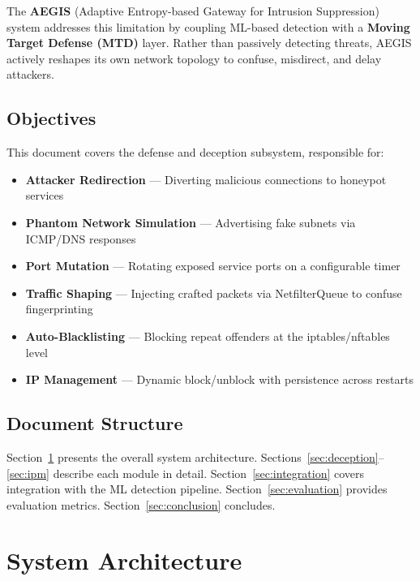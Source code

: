 \documentclass[12pt,a4paper]{article}
\begin{document}
The \textbf{AEGIS} (Adaptive Entropy-based Gateway for Intrusion Suppression) system addresses this limitation by coupling ML-based detection with a \textbf{Moving Target Defense (MTD)} layer. Rather than passively detecting threats, AEGIS actively reshapes its own network topology to confuse, misdirect, and delay attackers.

\subsection{Objectives}

This document covers the defense and deception subsystem, responsible for:

\begin{itemize}[leftmargin=*, itemsep=4pt]
    \item \textbf{Attacker Redirection} --- Diverting malicious connections to honeypot services
    \item \textbf{Phantom Network Simulation} --- Advertising fake subnets via ICMP/DNS responses
    \item \textbf{Port Mutation} --- Rotating exposed service ports on a configurable timer
    \item \textbf{Traffic Shaping} --- Injecting crafted packets via NetfilterQueue to confuse fingerprinting
    \item \textbf{Auto-Blacklisting} --- Blocking repeat offenders at the iptables/nftables level
    \item \textbf{IP Management} --- Dynamic block/unblock with persistence across restarts
\end{itemize}

\subsection{Document Structure}

Section~\ref{sec:architecture} presents the overall system architecture. Sections~\ref{sec:deception}--\ref{sec:ipm} describe each module in detail. Section~\ref{sec:integration} covers integration with the ML detection pipeline. Section~\ref{sec:evaluation} provides evaluation metrics. Section~\ref{sec:conclusion} concludes.

\section{System Architecture}
\label{sec:architecture}
\end{document}
